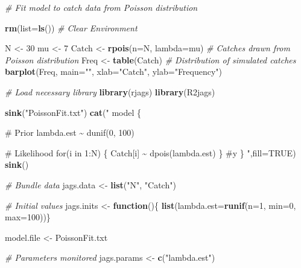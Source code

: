 \documentclass[
]{krantz}
\makeatletter
\newenvironment{Shaded}{\begin{snugshade}}{\end{snugshade}}
\newcommand{\AttributeTok}[1]{\textcolor[rgb]{0.27,0.27,0.27}{#1}}
\newcommand{\CommentTok}[1]{\textcolor[rgb]{0.37,0.37,0.37}{\textit{#1}}}
\newcommand{\ConstantTok}[1]{\textcolor[rgb]{0.37,0.37,0.37}{#1}}
\newcommand{\ControlFlowTok}[1]{\textcolor[rgb]{0.27,0.27,0.27}{\textbf{#1}}}
\newcommand{\DecValTok}[1]{\textcolor[rgb]{0.06,0.06,0.06}{#1}}
\newcommand{\FunctionTok}[1]{\textcolor[rgb]{0.27,0.27,0.27}{\textbf{#1}}}
\newcommand{\NormalTok}[1]{#1}
\newcommand{\OtherTok}[1]{\textcolor[rgb]{0.37,0.37,0.37}{#1}}
\newcommand{\StringTok}[1]{\textcolor[rgb]{0.5,0.5,0.5}{#1}}
\newenvironment{kframe}{%
\medskip{}
\setlength{\fboxsep}{.8em}
 \def\at@end@of@kframe{}%
 \ifinner\ifhmode%
  \def\at@end@of@kframe{\end{minipage}}%
  \begin{minipage}{\columnwidth}%
 \fi\fi%
 \def\FrameCommand##1{\hskip\@totalleftmargin \hskip-\fboxsep
 \colorbox{shadecolor}{##1}\hskip-\fboxsep
     \hskip-\linewidth \hskip-\@totalleftmargin \hskip\columnwidth}%
 \MakeFramed {\advance\hsize-\width
   \@totalleftmargin\z@ \linewidth\hsize
   \@setminipage}}%
 {\par\unskip\endMakeFramed%
 \at@end@of@kframe}
\renewenvironment{Shaded}{\begin{kframe}}{\end{kframe}}
\makeatother
\begin{document}
\begin{Shaded}
\begin{Highlighting}[]
\CommentTok{\# Fit model to catch data from Poisson distribution}

\FunctionTok{rm}\NormalTok{(}\AttributeTok{list=}\FunctionTok{ls}\NormalTok{()) }\CommentTok{\# Clear Environment}

\NormalTok{N }\OtherTok{\textless{}{-}} \DecValTok{30}
\NormalTok{mu }\OtherTok{\textless{}{-}} \DecValTok{7}
\NormalTok{Catch }\OtherTok{\textless{}{-}} \FunctionTok{rpois}\NormalTok{(}\AttributeTok{n=}\NormalTok{N, }\AttributeTok{lambda=}\NormalTok{mu) }\CommentTok{\# Catches drawn from Poisson distribution}
\NormalTok{Freq }\OtherTok{\textless{}{-}} \FunctionTok{table}\NormalTok{(Catch)  }\CommentTok{\# Distribution of simulated catches}
\FunctionTok{barplot}\NormalTok{(Freq, }\AttributeTok{main=}\StringTok{""}\NormalTok{, }\AttributeTok{xlab=}\StringTok{"Catch"}\NormalTok{, }\AttributeTok{ylab=}\StringTok{"Frequency"}\NormalTok{)}

\CommentTok{\# Load necessary library}
\FunctionTok{library}\NormalTok{(rjags)}
\FunctionTok{library}\NormalTok{(R2jags)}

\FunctionTok{sink}\NormalTok{(}\StringTok{"PoissonFit.txt"}\NormalTok{)}
\FunctionTok{cat}\NormalTok{(}\StringTok{"}
\StringTok{model \{}

\StringTok{\# Prior}
\StringTok{ lambda.est \textasciitilde{} dunif(0, 100)}

\StringTok{\# Likelihood}
\StringTok{    for(i in 1:N) \{}
\StringTok{      Catch[i] \textasciitilde{} dpois(lambda.est)}
\StringTok{      \} \#y}
\StringTok{\}}
\StringTok{    "}\NormalTok{,}\AttributeTok{fill=}\ConstantTok{TRUE}\NormalTok{)}
\FunctionTok{sink}\NormalTok{()}

\CommentTok{\# Bundle data}
\NormalTok{jags.data }\OtherTok{\textless{}{-}} \FunctionTok{list}\NormalTok{(}\StringTok{"N"}\NormalTok{, }\StringTok{"Catch"}\NormalTok{)}

\CommentTok{\# Initial values}
\NormalTok{jags.inits }\OtherTok{\textless{}{-}} \ControlFlowTok{function}\NormalTok{()\{ }\FunctionTok{list}\NormalTok{(}\AttributeTok{lambda.est=}\FunctionTok{runif}\NormalTok{(}\AttributeTok{n=}\DecValTok{1}\NormalTok{, }\AttributeTok{min=}\DecValTok{0}\NormalTok{, }\AttributeTok{max=}\DecValTok{100}\NormalTok{))\}}

\NormalTok{model.file }\OtherTok{\textless{}{-}} \StringTok{\textquotesingle{}PoissonFit.txt\textquotesingle{}}

\CommentTok{\# Parameters monitored}
\NormalTok{jags.params }\OtherTok{\textless{}{-}} \FunctionTok{c}\NormalTok{(}\StringTok{"lambda.est"}\NormalTok{)}


\end{Highlighting}
\end{Shaded}
\end{document}
